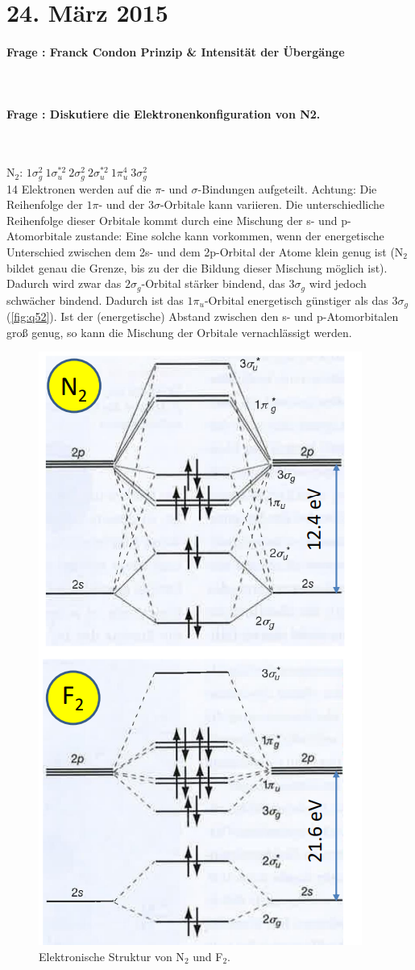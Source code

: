 \documentclass[a4paper, 11pt, ngerman, parskip=half-]{scrartcl}
\newcounter{question}
\newcommand{\question}[1]{\stepcounter{question}\paragraph{Frage \thequestion: #1}~}
\begin{document}
\section{24. März 2015}

\question{Franck Condon Prinzip \& Intensität der Übergänge}
\label{q:51}

\question{Diskutiere die Elektronenkonfiguration von N2.}
\label{q:52}

N$_2$: $1\sigma_g^2 ~ 1\sigma_u^{*2} ~ 2\sigma_g^2 ~ 2\sigma_u^{*2} ~ 1\pi_u^4 ~ 3\sigma_g^2$ \\
14 Elektronen werden auf die $\pi$- und $\sigma$-Bindungen aufgeteilt. Achtung: Die Reihenfolge der $1\pi$- und der $3\sigma$-Orbitale kann variieren. Die unterschiedliche Reihenfolge dieser Orbitale kommt durch eine Mischung der s- und p-Atomorbitale zustande: Eine solche kann vorkommen, wenn der energetische Unterschied zwischen dem 2s- und dem 2p-Orbital der Atome klein genug ist (N$_2$ bildet genau die Grenze, bis zu der die Bildung dieser Mischung möglich ist). Dadurch wird zwar das $2\sigma_g$-Orbital stärker bindend, das $3\sigma_g$ wird jedoch schwächer bindend. Dadurch ist das $1\pi_u$-Orbital energetisch günstiger als das $3\sigma_g$ (\autoref{fig:q52}). Ist der (energetische) Abstand zwischen den s- und p-Atomorbitalen groß genug, so kann die Mischung der Orbitale vernachlässigt werden.

\begin{figure}[H]  
    \centering
    \includegraphics[width=.4\textwidth]{resources/24-03-2015/N2-F2.png}
    \caption{Elektronische Struktur von N$_2$ und F$_2$.}
    \label{fig:q52}
\end{figure}
\end{document}
